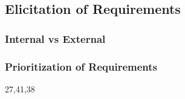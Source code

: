 \subsection{Elicitation of Requirements}

\subsubsection{Internal vs External}

\subsubsection{Prioritization of Requirements}

27,41,38